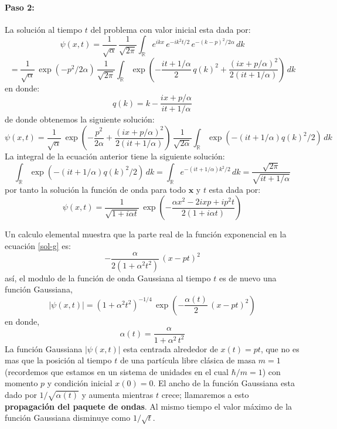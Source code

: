 \documentclass[12pt]{book}
\numberwithin{equation}{chapter}
\def\R{\mathbb{R}}
\def\x{\mathbf{x}}
\begin{document}
\paragraph{Paso 2:} La soluci\'on al tiempo $t$ del problema con valor inicial esta dada por:
$$ \psi(x,t)= \frac{1}{\sqrt{\alpha}} \, \frac{1}{\sqrt{2 \pi}} \int_{\R} e^{ikx}\, e^{-ik^{2}t/2} \, e^{-(k-p)^{2}/2\alpha} \, dk $$
\begin{equation}
= \frac{1}{\sqrt{\alpha}}\, \exp(-p^{2}/2\alpha) \, \frac{1}{\sqrt{2\pi}} \int_{\R} \exp \left( - \frac{it + 1/\alpha}{2}\, q(k)^{2} + \frac{ (ix+p/\alpha)^{2} }{ 2(it+1/\alpha) }   \right) \, dk
\end{equation}
en donde:
\begin{equation}
q(k)= k - \frac{ix + p/\alpha}{it+1/\alpha}
\end{equation}
de donde obtenemos la siguiente soluci\'on:
\begin{equation}
\psi (x,t)= \frac{1}{\sqrt{\alpha}} \, \exp \left( -\frac{p^{2}}{2\alpha} + \frac{(ix+p/\alpha)^{2}}{2(it + 1/\alpha)} \right) \, \frac{1}{\sqrt{2 \alpha}} \int_{\R} \exp (-(it+1/\alpha)q(k)^{2} /2 )\, dk
\end{equation}
La integral de la ecuaci\'on anterior tiene la siguiente soluci\'on: 
\begin{equation}
\int_{\R} \exp (-(it+1/\alpha)q(k)^{2} /2 )\, dk = \int_{\R} e^{ -(it+1/\alpha)k^{2}/2} \, dk= \frac{ \sqrt{2 \pi} }{ \sqrt{it + 1/\alpha} }
\end{equation}
por tanto la soluci\'on la funci\'on de onda para todo $\x$ y $t$ esta dada por:
\begin{equation}\label{sol-g}
\psi (x,t)= \frac{1}{\sqrt{1+i \alpha t}}\, \exp \left( - \frac{ \alpha x^{2}-2ixp + ip^{2}t }{2(1+i\alpha t)} \right)
\end{equation}

Un calculo elemental muestra que la parte real de la funci\'on exponencial en la ecuaci\'on \eqref{sol-g} es:
\begin{equation}
- \frac{\alpha}{ 2 (1 + \alpha^{2} t^{2}) } \, (x-pt)^{2}
\end{equation}
as\'i, el modulo de la funci\'on de onda Gaussiana al tiempo $t$ es de nuevo una funci\'on Gaussiana,
\begin{equation}
|\psi (x,t)|= (1+\alpha^{2} t^{2})^{-1/4} \, \exp \left( -\frac{\alpha(t)}{2}\, (x-pt)^{2} \right) 
\end{equation}
en donde,
\begin{equation}
\alpha (t)= \frac{\alpha}{ 1 + \alpha^{2}\, t^{2} }
\end{equation}
La funci\'on Gaussiana $|\psi (x,t)|$ esta centrada alrededor de $x(t)= pt$, que no es mas que la posici\'on al tiempo $t$ de una part\'icula libre cl\'asica de masa $m=1$ (recordemos que estamos en un sistema de unidades en el cual $\hbar / m=1$) con momento $p$ y condici\'on inicial $x(0)=0$. El ancho de la funci\'on Gaussiana esta dado por $1 / \sqrt{\alpha (t)}$ y aumenta mientras $t$ crece; llamaremos a esto {\bf propagaci\'on del paquete de ondas}. Al mismo tiempo el valor m\'aximo de la funci\'on Gaussiana disminuye como $1 / \sqrt{t}$.      
\end{document}
